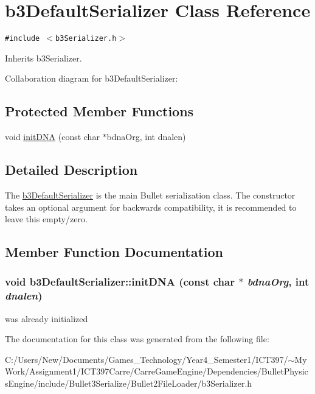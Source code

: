 \hypertarget{classb3_default_serializer}{
\section{b3DefaultSerializer Class Reference}
\label{classb3_default_serializer}
}
{\tt \#include $<$b3Serializer.h$>$}

Inherits b3Serializer.

Collaboration diagram for b3DefaultSerializer:\subsection*{Protected Member Functions}
\begin{CompactItemize}
\item 
void \hyperlink{classb3_default_serializer_9444bead16f644f135bdfc54c3b93fca}{initDNA} (const char $\ast$bdnaOrg, int dnalen)
\end{CompactItemize}


\subsection{Detailed Description}
The \hyperlink{classb3_default_serializer}{b3DefaultSerializer} is the main Bullet serialization class. The constructor takes an optional argument for backwards compatibility, it is recommended to leave this empty/zero. 

\subsection{Member Function Documentation}
\hypertarget{classb3_default_serializer_9444bead16f644f135bdfc54c3b93fca}{
\subsubsection[initDNA]{\setlength{\rightskip}{0pt plus 5cm}void b3DefaultSerializer::initDNA (const char $\ast$ {\em bdnaOrg}, \/  int {\em dnalen})}}
\label{classb3_default_serializer_9444bead16f644f135bdfc54c3b93fca}




was already initialized 

The documentation for this class was generated from the following file:\begin{CompactItemize}
\item 
C:/Users/New/Documents/Games\_\-Technology/Year4\_\-Semester1/ICT397/$\sim$My Work/Assignment1/ICT397Carre/CarreGameEngine/Dependencies/BulletPhysicsEngine/include/Bullet3Serialize/Bullet2FileLoader/b3Serializer.h\end{CompactItemize}
